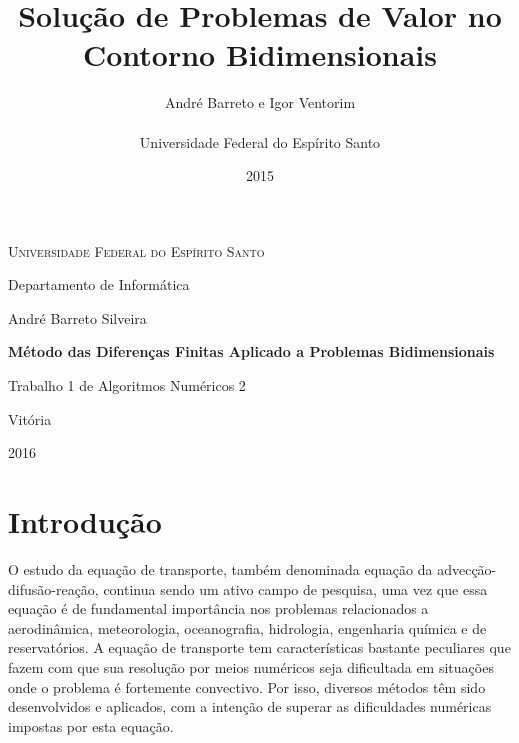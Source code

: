 \documentclass[
	11pt,				%
	oneside,			%
	a4paper,			%
	english,			%
	brazil,				%
	]{article}
\title{\textbf{Solução de Problemas de Valor no Contorno Bidimensionais}}
\author{
André Barreto e Igor Ventorim\\\\
\normalsize Universidade Federal do Espírito Santo\\
}
\date{2015}
\begin{document}


\frenchspacing

\graphicspath{ {Imagens/} }

\begin{titlepage}
	\centering
	{\scshape \large Universidade Federal do Espírito Santo\par}
	{\large Departamento de Informática\par}
	\vspace{1cm}
	{\large André Barreto Silveira\par}
	
	\vfill
	
	{\LARGE \bfseries Método das Diferenças Finitas Aplicado a
Problemas Bidimensionais\par}
	\vspace{1cm}
	{\large Trabalho 1 de Algoritmos Numéricos 2\par}

	\vfill

	{\large Vitória\par}
	{\large 2016\par}
\end{titlepage}
\addtocounter{page}{1}

\section{Introdução}
O estudo da equação de transporte, também denominada equação da 
advecção-difusão-reação, continua sendo um ativo campo de pesquisa, uma vez que 
essa equação é de fundamental importância nos problemas relacionados a 
aerodinâmica,  meteorologia, oceanografia, hidrologia, engenharia química e
de reservatórios. A equação de transporte tem características bastante 
peculiares que fazem com que sua  resolução por meios numéricos seja 
dificultada em situações onde o problema é fortemente convectivo. Por isso, 
diversos métodos têm sido desenvolvidos e aplicados, com a intenção de superar 
as dificuldades numéricas impostas por esta equação.
\end{document}
